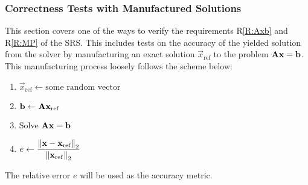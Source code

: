 \documentclass[12pt, titlepage]{article}
\newcommand{\rref}[1]{R\ref{#1}}
\begin{document}
\subsubsection{Correctness Tests with Manufactured Solutions}

This section covers one of the ways to verify the requirements \rref{R:Axb} and
\rref{R:MP} of the SRS. This includes tests on the accuracy of the yielded
solution from the solver by manufacturing an exact solution \(\vec{x}_\mathrm{ref}\) to the
problem \(\mathbf{A}\mathbf{x} = \mathbf{b}\). This manufacturing process loosely follows the scheme
below:

\begin{enumerate}
\item \(\vec{x}_\mathrm{ref} \gets \text{some random vector}\)
\item \(\mathbf{b} \gets \mathbf{A} \mathbf{x}_\mathrm{ref} \)
\item Solve \(\mathbf{A}\mathbf{x} = \mathbf{b}\)
\item \(e \gets \displaystyle \frac{\left\lVert\mathbf{x} - \mathbf{x}_\mathrm{ref}\right\rVert_2}{\left\lVert\mathbf{x}_\mathrm{ref}\right\rVert_2}\)
\end{enumerate}

The relative error \(e\) will be used as the accuracy metric.
\end{document}
